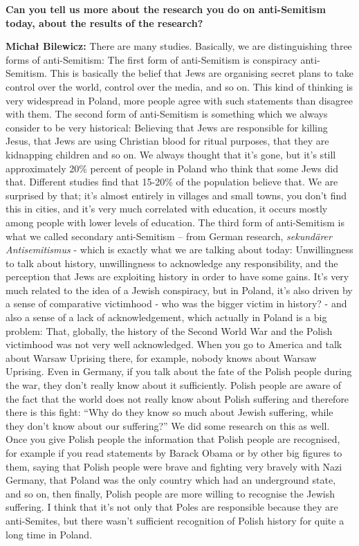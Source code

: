 \textbf{Can you tell us more about the research you do on anti-Semitism today, about the results of the research?} 

\textbf{Michał Bilewicz:} There are many studies. Basically, we are distinguishing three forms of anti-Semitism: The first form of anti-Semitism is conspiracy anti-Semitism. This is basically the belief that Jews are organising secret plans to take control over the world, control over the media, and so on. This kind of thinking is very widespread in Poland, more people agree with such statements than disagree with them. The second form of anti-Semitism is something which we always consider to be very historical: Believing that Jews are responsible for killing Jesus, that Jews are using Christian blood for ritual purposes, that they are kidnapping children and so on. We always thought that it’s gone, but it’s still approximately 20\% percent of people in Poland who think that some Jews did that. Different studies find that 15-20\% of the population believe that. We are surprised by that; it’s almost entirely in villages and small towns, you don’t find this in cities, and it’s very much correlated with education, it occurs mostly among people with lower levels of education. The third form of anti-Semitism is what we called secondary anti-Semitism – from German research, \textit{sekundärer Antisemitismus} - which is exactly what we are talking about today: Unwillingness to talk about history, unwillingness to acknowledge any responsibility, and the perception that Jews are exploiting history in order to have some gains. It’s very much related to the idea of a Jewish conspiracy, but in Poland, it's also driven by a sense of comparative victimhood - who was the bigger victim in history? - and also a sense of a lack of acknowledgement, which actually in Poland is a big problem: That, globally, the history of the Second World War and the Polish victimhood was not very well acknowledged. When you go to America and talk about Warsaw Uprising there, for example, nobody knows about Warsaw Uprising. Even in Germany, if you talk about the fate of the Polish people during the war, they don’t really know about it sufficiently. Polish people are aware of the fact that the world does not really know about Polish suffering and therefore there is this fight: ``Why do they know so much about Jewish suffering, while they don’t know about our suffering?'' We did some research on this as well. Once you give Polish people the information that Polish people are recognised, for example if you read statements by Barack Obama or by other big figures to them, saying that Polish people were brave and fighting very bravely with Nazi Germany, that Poland was the only country which had an underground state, and so on, then finally, Polish people are more willing to recognise the Jewish suffering. I think that it's not only that Poles are responsible because they are anti-Semites, but there wasn't sufficient recognition of Polish history for quite a long time in Poland.

